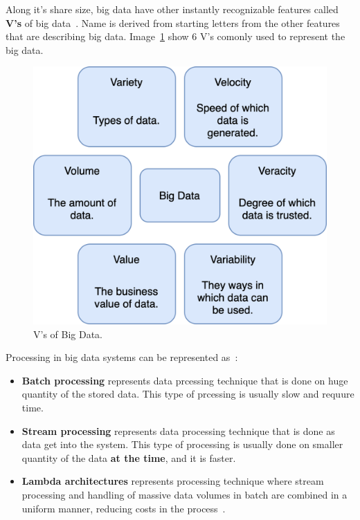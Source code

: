 Along it's share size, big data have other instantly recognizable features called \textbf{V's} of big data~\cite{PatgiriA16}. Name is derived from starting letters from the other features that are describing big data. Image~\ref{fig:fig3} show 6 V's comonly used to represent the big data.

\begin{figure}[H]
	\begin{center}
		\includegraphics[scale=0.7]{images/Figure3.png}
	\end{center}
	\vspace{-0.6cm}
	\caption{V's of Big Data.}
	\label{fig:fig3}
\end{figure}

Processing in big data systems can be represented as~\cite{phdthesis, KiranMMDB15}:

\begin{itemize}
	\item \textbf{Batch processing} represents data prcessing technique that is done on huge quantity of the stored data. This type of prcessing is usually slow and requure time.
	\item \textbf{Stream processing} represents data processing technique that is done as data get into the system. This type of processing is usually done on smaller quantity of the data \textbf{at the time}, and it is faster.
	\item \textbf{Lambda architectures} represents processing technique where stream processing and handling of massive data volumes in batch are combined in a uniform manner, reducing costs in the process~\cite{KiranMMDB15}.
\end{itemize}


